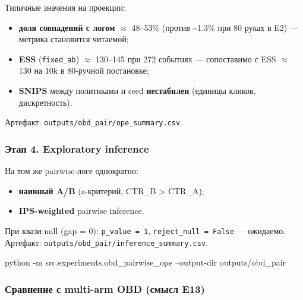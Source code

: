 Типичные значения на проекции:

\begin{itemize}
\tightlist
\item
  \textbf{доля совпадений с логом} $\approx$ 48--53\% (против \textasciitilde1,3\% при 80 руках в E2) --- метрика становится читаемой;
\item
  \textbf{ESS} (\texttt{fixed\_ab}) $\approx$ 130--145 при 272 событиях --- сопоставимо с ESS $\approx$ 130 на 10k в 80-ручной постановке;
\item
  \textbf{SNIPS} между политиками и seed \textbf{нестабилен} (единицы кликов, дискретность).
\end{itemize}

Артефакт: \texttt{outputs/obd\_pair/ope\_summary.csv}.

\subsubsection{Этап 4. Exploratory inference}\label{ux44dux442ux430ux43f-4.-exploratory-inference}

На том же pairwise-логе однократно:

\begin{itemize}
\tightlist
\item
  \textbf{наивный A/B} (z-критерий, CTR\_B \textgreater{} CTR\_A);
\item
  \textbf{IPS-weighted} pairwise inference.
\end{itemize}

При квази-null (gap = 0): \texttt{p\_value\ =\ 1}, \texttt{reject\_null\ =\ False} --- ожидаемо. Артефакт: \texttt{outputs/obd\_pair/inference\_summary.csv}.

\begin{pythoncode}
python -m src.experiments.obd_pairwise_ope --output-dir outputs/obd_pair
\end{pythoncode}


\subsubsection{Сравнение с multi-arm OBD (смысл E13)}\label{ux441ux440ux430ux432ux43dux435ux43dux438ux435-ux441-multi-arm-obd-ux441ux43cux44bux441ux43b-e13}

